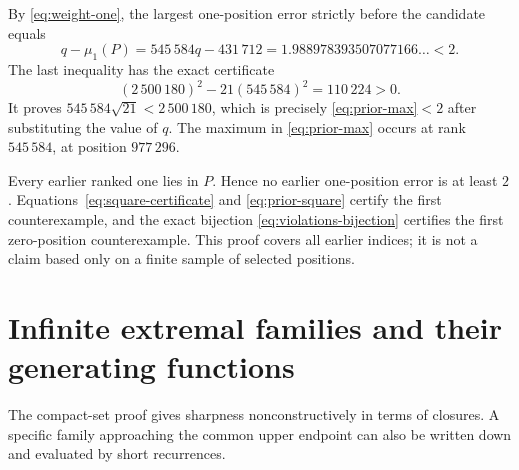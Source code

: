 \documentclass[11pt]{article}
\numberwithin{equation}{section}
\theoremstyle{definition}
\theoremstyle{remark}
\begin{document}
By \eqref{eq:weight-one}, the largest one-position error strictly before
the candidate equals
\begin{equation}\label{eq:prior-max}
q-\mu_1(P)=545\,584q-431\,712
=1.988978393507077166\ldots<2.
\end{equation}
The last inequality has the exact certificate
\begin{equation}\label{eq:prior-square}
(2\,500\,180)^2-21(545\,584)^2=110\,224>0.
\end{equation}
It proves $545\,584\sqrt{21}<2\,500\,180$, which is precisely
\eqref{eq:prior-max}$<2$ after substituting the value of $q$.
The maximum in \eqref{eq:prior-max} occurs at rank $545\,584$, at
position $977\,296$.

Every earlier ranked one lies in $P$. Hence no earlier one-position error
is at least $2$. Equations~\eqref{eq:square-certificate} and
\eqref{eq:prior-square} certify the first counterexample, and the exact
bijection \eqref{eq:violations-bijection} certifies the first zero-position
counterexample. This proof covers all earlier indices; it is not a claim
based only on a finite sample of selected positions.

\section{Infinite extremal families and their generating functions}\label{sec:infinite}

The compact-set proof gives sharpness nonconstructively in terms of
closures. A specific family approaching the common upper endpoint can
also be written down and evaluated by short recurrences.
\end{document}
